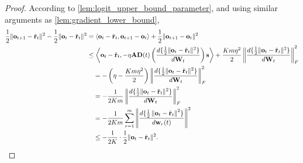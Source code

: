 \begin{proof}
According to \cref{lem:logit_upper_bound_parameter}, and using similar arguments as \cref{lem:gradient_lower_bound},
\begin{equation*}
\begin{split}
    \frac{1}{2} \| {\mathbf{o}}_{t+1} - \hat{{\mathbf{r}}}_t \|^2 - \frac{1}{2} \| {\mathbf{o}}_t - \hat{{\mathbf{r}}}_t \|^2 &= \left\langle {\mathbf{o}}_t - \hat{{\mathbf{r}}}_t, {\mathbf{o}}_{t+1} - {\mathbf{o}}_t \right\rangle + \frac{1}{2} \| {\mathbf{o}}_{t+1} - {\mathbf{o}}_t  \|^2 \\
    &\le \left\langle {\mathbf{o}}_t - \hat{{\mathbf{r}}}_t, - \eta {\mathbf{A}} {\mathbf{D}}(t) \left( \frac{d \{ \frac{1}{2} \| {\mathbf{o}}_t - \hat{{\mathbf{r}}}_t \|^2 \}}{d {\mathbf{W}}_t} \right) {\mathbf{s}} \right\rangle + \frac{K m \eta^2}{2} \left\| \frac{d \{ \frac{1}{2} \| {\mathbf{o}}_t - \hat{{\mathbf{r}}}_t \|^2 \}}{d {\mathbf{W}}_t}  \right\|_F^2 \\
    &\quad = - \left( \eta - \frac{K m \eta^2}{2} \right) \left\| \frac{d \{ \frac{1}{2} \| {\mathbf{o}}_t - \hat{{\mathbf{r}}}_t \|^2 \}}{d {\mathbf{W}}_t}  \right\|_F^2 \\
    &\quad = - \frac{1}{2 K m} \left\| \frac{d \{ \frac{1}{2} \| {\mathbf{o}}_t - \hat{{\mathbf{r}}}_t \|^2 \}}{d {\mathbf{W}}_t}  \right\|_F^2 \\
    &\quad = - \frac{1}{2 K m} \sum\limits_{r = 1}^{m}{ \left\| \frac{d \{ \frac{1}{2} \left\| {\mathbf{o}}_t - \hat{{\mathbf{r}}}_t \right\|^2 \}}{d {\mathbf{w}}_r(t)}  \right\|^2 } \\
    &\quad \le - \frac{1}{2 K} \cdot \frac{1}{2} \| {\mathbf{o}}_t - \hat{{\mathbf{r}}}_t \|^2. \qedhere
\end{split}
\end{equation*}
\end{proof}